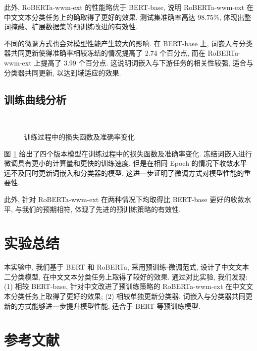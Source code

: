 \documentclass[12pt,a4paper]{article}
\begin{document}
此外, RoBERTa-wwm-ext 的性能略优于 BERT-base, 说明 RoBERTa-wwm-ext 在中文文本分类任务上的确取得了更好的效果, 测试集准确率高达 98.75\%, 体现出整词掩蔽、扩展数据集等预训练改进的有效性.

不同的微调方式也会对模型性能产生较大的影响. 在 BERT-base 上, 词嵌入与分类器共同更新使得准确率相较冻结的情况提高了 2.74 个百分点, 而在 RoBERTa-wwm-ext 上提高了 3.99 个百分点. 这说明词嵌入与下游任务的相关性较强, 适合与分类器共同更新, 以达到域适应的效果.

\subsection{训练曲线分析}

\begin{figure}[htbp]
    \centering
    \\
    \caption{训练过程中的损失函数及准确率变化}
    \label{fig:learning-curves}
\end{figure}


图 \ref{fig:learning-curves} 给出了四个版本模型在训练过程中的损失函数及准确率变化. 冻结词嵌入进行微调具有更小的计算量和更快的训练速度, 但是在相同 Epoch 的情况下收敛水平远不及同时更新词嵌入和分类器的模型. 这进一步证明了微调方式对模型性能的重要性.

此外, 针对 RoBERTa-wwm-ext 在两种情况下均取得比 BERT-base 更好的收敛水平, 与我们的预期相符, 体现了先进的预训练策略的有效性.

\section{实验总结}

本实验中, 我们基于 BERT 和 RoBERTa, 采用预训练-微调范式, 设计了中文文本二分类模型, 在中文文本分类任务上取得了较好的效果. 通过对比实验, 我们发现: (1) 相较 BERT-base, 针对中文改进了预训练策略的 RoBERTa-wwm-ext 在中文文本分类任务上取得了更好的效果; (2) 相较单独更新分类器, 词嵌入与分类器共同更新的方式能够进一步提升模型性能, 适合于 BERT 等预训练模型.

\section{参考文献}

\renewcommand{\bibsection}{}


\end{document}
